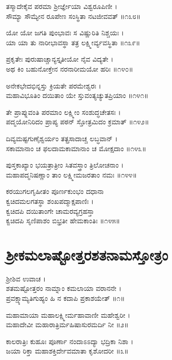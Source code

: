 ತಸ್ಮಾದೇಕೈವ ಪರಮಾ ಶ್ರೀರ್ಜ್ಞೇಯಾ ವಿಶ್ವರೂಪಿಣೀ ।\\
ಸೌಮ್ಯಾ ಸೌಮ್ಯೇನ ರೂಪೇಣ ಸಂಸ್ಥಿತಾ ನಟಜೀವವತ್ ॥೧೩೮॥

ಯೋ ಯೋ ಜಗತಿ ಪುಂಭಾವಃ ಸ ವಿಷ್ಣುರಿತಿ ನಿಶ್ಚಯಃ ।\\
ಯಾ ಯಾ ತು ನಾರೀಭಾವಸ್ಥಾ ತತ್ರ ಲಕ್ಷ್ಮೀರ್ವ್ಯವಸ್ಥಿತಾ ॥೧೩೯॥

ಪ್ರಕೃತೇಃ ಪುರುಷಾಚ್ಚಾನ್ಯಸ್ತೃತೀಯೋ ನೈವ ವಿದ್ಯತೇ ।\\
ಅಥ ಕಿಂ ಬಹುನೋಕ್ತೇನ ನರನಾರೀಮಯೋ ಹರಿಃ ॥೧೪೦॥

ಅನೇಕಭೇದಭಿನ್ನಸ್ತು ಕ್ರಿಯತೇ ಪರಮೇಶ್ವರಃ ।\\
ಮಹಾವಿಭೂತಿಂ ದಯಿತಾಂ ಯೇ ಸ್ತುವಂತ್ಯಚ್ಯುತಪ್ರಿಯಾಂ ॥೧೪೧॥

ತೇ ಪ್ರಾಪ್ನುವಂತಿ ಪರಮಾಂ ಲಕ್ಷ್ಮೀಂ ಸಂಶುದ್ಧಚೇತಸಃ ।\\
ಪದ್ಮಯೋನಿರಿದಂ ಪ್ರಾಪ್ಯ ಪಠನ್ ಸ್ತೋತ್ರಮಿದಂ ಕ್ರಮಾತ್ ॥೧೪೨॥

ದಿವ್ಯಮಷ್ಟಗುಣೈಶ್ವರ್ಯಂ ತತ್ಪ್ರಸಾದಾಚ್ಚ ಲಬ್ಧವಾನ್ ।\\
ಸಕಾಮಾನಾಂ ಚ ಫಲದಾಮಕಾಮಾನಾಂ ಚ ಮೋಕ್ಷದಾಂ ॥೧೪೩॥

ಪುಸ್ತಕಾಖ್ಯಾಂ ಭಯತ್ರಾತ್ರೀಂ ಸಿತವಸ್ತ್ರಾಂ ತ್ರಿಲೋಚನಾಂ ।\\
ಮಹಾಪದ್ಮನಿಷಣ್ಣಾಂ ತಾಂ ಲಕ್ಷ್ಮೀಮಜರತಾಂ ನಮಃ ॥೧೪೪॥

ಕರಯುಗಲಗೃಹೀತಂ ಪೂರ್ಣಕುಂಭಂ ದಧಾನಾ\\
ಕ್ವಚಿದಮಲಗತಸ್ಥಾ ಶಂಖಪದ್ಮಾಕ್ಷಪಾಣಿಃ ।\\
ಕ್ವಚಿದಪಿ ದಯಿತಾಂಗೇ ಚಾಮರವ್ಯಗ್ರಹಸ್ತಾ\\
ಕ್ವಚಿದಪಿ ಸೃಣಿಪಾಶಂ ಬಿಭ್ರತೀ ಹೇಮಕಾಂತಿಃ ॥೧೪೫॥

\section{ಶ್ರೀಕಮಲಾಷ್ಟೋತ್ತರಶತನಾಮಸ್ತೋತ್ರಂ}


ಶ್ರೀಶಿವ ಉವಾಚ ।\\
ಶತಮಷ್ಟೋತ್ತರಂ ನಾಮ್ನಾಂ ಕಮಲಾಯಾ ವರಾನನೇ ।\\
ಪ್ರವಕ್ಷ್ಯಾಮ್ಯತಿಗುಹ್ಯಂ ಹಿ ನ ಕದಾಪಿ ಪ್ರಕಾಶಯೇತ್ ॥೧॥

ಮಹಾಮಾಯಾ ಮಹಾಲಕ್ಷ್ಮೀರ್ಮಹಾವಾಣೀ ಮಹೇಶ್ವರೀ ।\\
ಮಹಾದೇವೀ ಮಹಾರಾತ್ರಿರ್ಮಹಿಷಾಸುರಮರ್ದಿ ನೀ ॥೨॥

ಕಾಲರಾತ್ರಿಃ ಕುಹೂಃ ಪೂರ್ಣಾ ನಂದಾಽಽದ್ಯಾ ಭದ್ರಿಕಾ ನಿಶಾ ।\\
ಜಯಾ ರಿಕ್ತಾ ಮಹಾಶಕ್ತಿರ್ದೇವಮಾತಾ ಕೃಶೋದರೀ ॥೩॥

